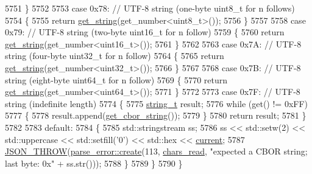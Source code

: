 \begin{DoxyCode}
5751             \}
5752 
5753             \textcolor{keywordflow}{case} 0x78: \textcolor{comment}{// UTF-8 string (one-byte uint8\_t for n follows)}
5754             \{
5755                 \textcolor{keywordflow}{return} \hyperlink{classnlohmann_1_1detail_1_1binary__reader_a195b573a807da6d5841a898c6f74e03c}{get\_string}(get\_number<uint8\_t>());
5756             \}
5757 
5758             \textcolor{keywordflow}{case} 0x79: \textcolor{comment}{// UTF-8 string (two-byte uint16\_t for n follow)}
5759             \{
5760                 \textcolor{keywordflow}{return} \hyperlink{classnlohmann_1_1detail_1_1binary__reader_a195b573a807da6d5841a898c6f74e03c}{get\_string}(get\_number<uint16\_t>());
5761             \}
5762 
5763             \textcolor{keywordflow}{case} 0x7A: \textcolor{comment}{// UTF-8 string (four-byte uint32\_t for n follow)}
5764             \{
5765                 \textcolor{keywordflow}{return} \hyperlink{classnlohmann_1_1detail_1_1binary__reader_a195b573a807da6d5841a898c6f74e03c}{get\_string}(get\_number<uint32\_t>());
5766             \}
5767 
5768             \textcolor{keywordflow}{case} 0x7B: \textcolor{comment}{// UTF-8 string (eight-byte uint64\_t for n follow)}
5769             \{
5770                 \textcolor{keywordflow}{return} \hyperlink{classnlohmann_1_1detail_1_1binary__reader_a195b573a807da6d5841a898c6f74e03c}{get\_string}(get\_number<uint64\_t>());
5771             \}
5772 
5773             \textcolor{keywordflow}{case} 0x7F: \textcolor{comment}{// UTF-8 string (indefinite length)}
5774             \{
5775                 \hyperlink{classnlohmann_1_1detail_1_1binary__reader_a889a8702ca8aa45e99136bc31ea898e9}{string\_t} result;
5776                 \textcolor{keywordflow}{while} (\textcolor{keyword}{get}() != 0xFF)
5777                 \{
5778                     result.append(\hyperlink{classnlohmann_1_1detail_1_1binary__reader_ac626ec37d1724d9d36d918c6361f8e57}{get\_cbor\_string}());
5779                 \}
5780                 \textcolor{keywordflow}{return} result;
5781             \}
5782 
5783             \textcolor{keywordflow}{default}:
5784             \{
5785                 std::stringstream ss;
5786                 ss << std::setw(2) << std::uppercase << std::setfill(\textcolor{charliteral}{'0'}) << std::hex << 
      \hyperlink{classnlohmann_1_1detail_1_1binary__reader_a7e994e201b215cd6d6ae28a1853f43e0}{current};
5787                 \hyperlink{json_8hpp_a6c274f6db2e65c1b66c7d41b06ad690f}{JSON\_THROW}(\hyperlink{classnlohmann_1_1detail_1_1parse__error_a9fd60ad6bce80fd99686ad332faefd37}{parse\_error::create}(113, 
      \hyperlink{classnlohmann_1_1detail_1_1binary__reader_a2dbde0b7390100efe0bfc54e21c3a34b}{chars\_read}, \textcolor{stringliteral}{"expected a CBOR string; last byte: 0x"} + ss.str()));
5788             \}
5789         \}
5790     \}
\end{DoxyCode}
